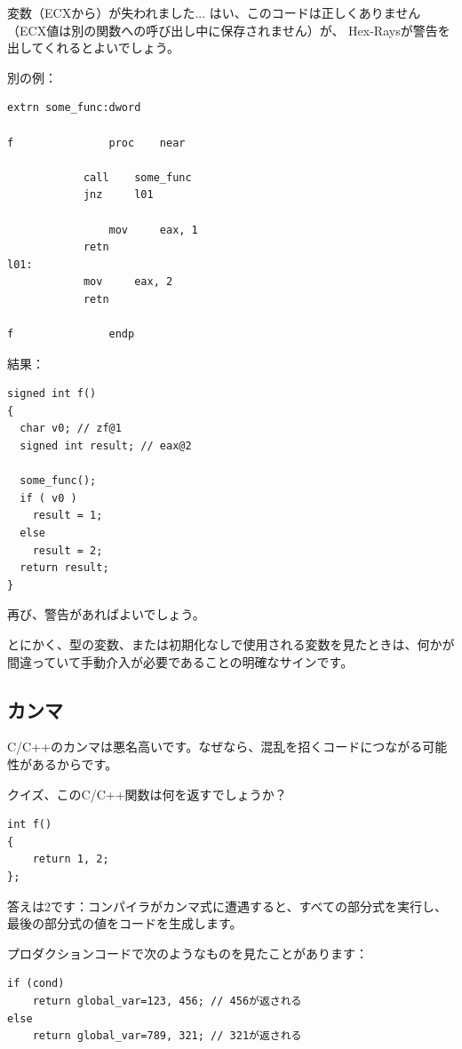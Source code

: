 変数（ECXから）が失われました...
はい、このコードは正しくありません（ECX値は別の関数への呼び出し中に保存されません）が、
Hex-Raysが警告を出してくれるとよいでしょう。

別の例：

\begin{lstlisting}
extrn some_func:dword

f               proc    near

	        call    some_func
        	jnz     l01

                mov     eax, 1
	        retn
l01:
	        mov     eax, 2
        	retn

f               endp
\end{lstlisting}

結果：

\begin{lstlisting}
signed int f()
{
  char v0; // zf@1
  signed int result; // eax@2

  some_func();
  if ( v0 )
    result = 1;
  else
    result = 2;
  return result;
}
\end{lstlisting}

再び、警告があればよいでしょう。

とにかく、型の変数、または初期化なしで使用される変数を見たときは、何かが間違っていて手動介入が必要であることの明確なサインです。

\subsection{カンマ}

C/C++のカンマは悪名高いです。なぜなら、混乱を招くコードにつながる可能性があるからです。

クイズ、このC/C++関数は何を返すでしょうか？

\begin{lstlisting}
int f()
{
	return 1, 2;
};
\end{lstlisting}

答えは2です：コンパイラがカンマ式に遭遇すると、すべての部分式を実行し、最後の部分式の値をコードを生成します。

プロダクションコードで次のようなものを見たことがあります：

\begin{lstlisting}
if (cond)
	return global_var=123, 456; // 456が返される
else
	return global_var=789, 321; // 321が返される
\end{lstlisting}

